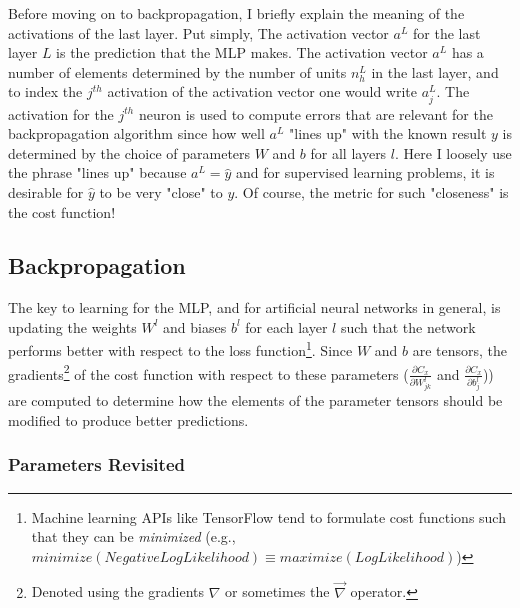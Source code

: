 \documentclass{article}
\begin{document}
Before moving on to backpropagation, I briefly explain the meaning of the activations
of the last layer. Put simply, The activation vector $a^{L}$ for the last layer $L$ is the prediction
that the MLP makes. The activation vector $a^{L}$ has a number of elements
determined by the number of units $n_h^{L}$ in the last layer, and to index the $j^{th}$
activation of the activation vector one would write $a_j^{L}$. The activation for
the $j^{th}$ neuron is used to compute errors that are relevant for the
backpropagation algorithm since how well $a^{L}$ "lines up" with the known
result $y$ is determined by the choice of parameters $W$ and $b$ for all layers $l$.
Here I loosely use the phrase "lines up" because $a^{L} = \hat{y}$ and for supervised
learning problems, it is desirable for $\hat{y}$ to be very "close" to $y$. Of
course, the metric for such "closeness" is the cost function!

\subsection{Backpropagation}

\quad The key to learning for the MLP, and for artificial neural networks in general,
is updating the weights $W^{l}$ and biases $b^{l}$ for each layer $l$ such
that the network performs better with respect to the loss function\footnote{
Machine learning APIs like TensorFlow tend to formulate cost functions
such that they can be \textit{minimized} (e.g.,
$minimize(NegativeLogLikelihood) \equiv maximize(LogLikelihood)$)}.
Since $W$ and $b$ are tensors, the gradients\footnote{Denoted
	using the gradients $\nabla$ or sometimes the $\vec{\nabla}$ operator.}
of the cost function with respect to these parameters ($\frac{\partial C_x}{\partial W_{jk}^{l}}$
and $\frac{\partial C_x}{\partial b_{j}^{l}}$)) are computed to determine how
the elements of the parameter tensors should be modified to produce better predictions.

\subsubsection{Parameters Revisited}
\end{document}
